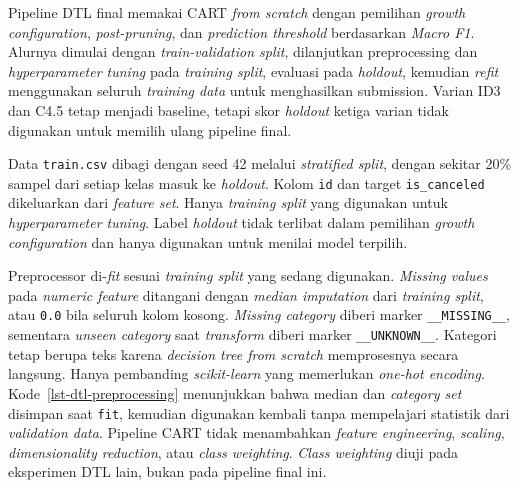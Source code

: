 Pipeline DTL final memakai CART \textit{from scratch} dengan pemilihan \textit{growth configuration}, \textit{post-pruning}, dan \textit{prediction threshold} berdasarkan \textit{Macro F1}. Alurnya dimulai dengan \textit{train-validation split}, dilanjutkan preprocessing dan \textit{hyperparameter tuning} pada \textit{training split}, evaluasi pada \textit{holdout}, kemudian \textit{refit} menggunakan seluruh \textit{training data} untuk menghasilkan submission. Varian ID3 dan C4.5 tetap menjadi baseline, tetapi skor \textit{holdout} ketiga varian tidak digunakan untuk memilih ulang pipeline final.

Data \texttt{train.csv} dibagi dengan seed 42 melalui \textit{stratified split}, dengan sekitar 20\% sampel dari setiap kelas masuk ke \textit{holdout}. Kolom \texttt{id} dan target \texttt{is\_canceled} dikeluarkan dari \textit{feature set}. Hanya \textit{training split} yang digunakan untuk \textit{hyperparameter tuning}. Label \textit{holdout} tidak terlibat dalam pemilihan \textit{growth configuration} dan hanya digunakan untuk menilai model terpilih.

Preprocessor di-\textit{fit} sesuai \textit{training split} yang sedang digunakan. \textit{Missing values} pada \textit{numeric feature} ditangani dengan \textit{median imputation} dari \textit{training split}, atau \texttt{0.0} bila seluruh kolom kosong. \textit{Missing category} diberi marker \texttt{\_\_MISSING\_\_}, sementara \textit{unseen category} saat \textit{transform} diberi marker \texttt{\_\_UNKNOWN\_\_}. Kategori tetap berupa teks karena \textit{decision tree from scratch} memprosesnya secara langsung. Hanya pembanding \textit{scikit-learn} yang memerlukan \textit{one-hot encoding}. Kode~\ref{lst-dtl-preprocessing} menunjukkan bahwa median dan \textit{category set} disimpan saat \texttt{fit}, kemudian digunakan kembali tanpa mempelajari statistik dari \textit{validation data}. Pipeline CART tidak menambahkan \textit{feature engineering}, \textit{scaling}, \textit{dimensionality reduction}, atau \textit{class weighting}. \textit{Class weighting} diuji pada eksperimen DTL lain, bukan pada pipeline final ini.

